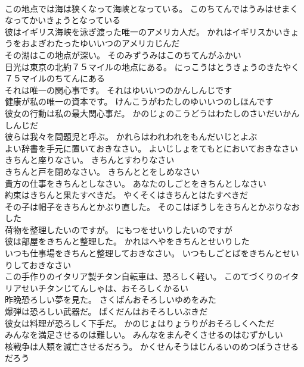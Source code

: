\documentclass[8pt]{extreport}
\begin{document}
\begin{CJK}{UTF8}{min}
\\	この地点では海は狭くなって海峡となっている。	このちてんではうみはせまくなってかいきょうとなっている 
\\	彼はイギリス海峡を泳ぎ渡った唯一のアメリカ人だ。	かれはイギリスかいきょうをおよぎわたったゆいいつのアメリカじんだ 
\\	その湖はこの地点が深い。	そのみずうみはこのちてんがふかい 
\\	日光は東京の北約７５マイルの地点にある。	にっこうはとうきょうのきたやく７５マイルのちてんにある 
\\	それは唯一の関心事です。	それはゆいいつのかんしんじです 
\\	健康が私の唯一の資本です。	けんこうがわたしのゆいいつのしほんです 
\\	彼女の行動は私の最大関心事だ。	かのじょのこうどうはわたしのさいだいかんしんじだ 
\\	彼らは我々を問題児と呼ぶ。	かれらはわれわれをもんだいじとよぶ 
\\	よい辞書を手元に置いておきなさい。	よいじしょをてもとにおいておきなさい 
\\	きちんと座りなさい。	きちんとすわりなさい 
\\	きちんと戸を閉めなさい。	きちんととをしめなさい 
\\	貴方の仕事をきちんとしなさい。	あなたのしごとをきちんとしなさい 
\\	約束はきちんと果たすべきだ。	やくそくはきちんとはたすべきだ 
\\	その子は帽子をきちんとかぶり直した。	そのこはぼうしをきちんとかぶりなおした 
\\	荷物を整理したいのですが。	にもつをせいりしたいのですが 
\\	彼は部屋をきちんと整理した。	かれはへやをきちんとせいりした 
\\	いつも仕事場をきちんと整理しておきなさい。	いつもしごとばをきちんとせいりしておきなさい 
\\	この手作りのイタリア製チタン自転車は、恐ろしく軽い。	このてづくりのイタリアせいチタンじてんしゃは、おそろしくかるい 
\\	昨晩恐ろしい夢を見た。	さくばんおそろしいゆめをみた 
\\	爆弾は恐ろしい武器だ。	ばくだんはおそろしいぶきだ 
\\	彼女は料理が恐ろしく下手だ。	かのじょはりょうりがおそろしくへただ 
\\	みんなを満足させるのは難しい。	みんなをまんぞくさせるのはむずかしい 
\\	核戦争は人類を滅亡させるだろう。	かくせんそうはじんるいのめつぼうさせるだろう 

\end{CJK}
\end{document}
